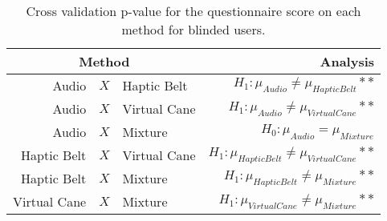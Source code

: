 
\begin{table}[!htb]
\centering
\caption{Cross validation p-value for the questionnaire score on each method for blinded users.}
\label{tab:lsd_questionnaire}
\begin{tabular}{rclr}
\toprule
      \multicolumn{3}{c}{Method} &                                           Analysis \\
\midrule
       Audio & $X$ & Haptic Belt &        $H_1 : \mu_{Audio} \ne \mu_{Haptic Belt}**$ \\
      Audio & $X$ & Virtual Cane &       $H_1 : \mu_{Audio} \ne \mu_{Virtual Cane}**$ \\
           Audio & $X$ & Mixture &                $H_0 : \mu_{Audio} = \mu_{Mixture}$ \\
Haptic Belt & $X$ & Virtual Cane & $H_1 : \mu_{Haptic Belt} \ne \mu_{Virtual Cane}**$ \\
     Haptic Belt & $X$ & Mixture &      $H_1 : \mu_{Haptic Belt} \ne \mu_{Mixture}**$ \\
    Virtual Cane & $X$ & Mixture &     $H_1 : \mu_{Virtual Cane} \ne \mu_{Mixture}**$ \\
\bottomrule
\end{tabular}
\end{table}

